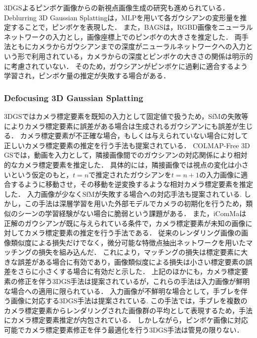 3DGSよるピンボケ画像からの新視点画像生成の研究も進められている．
Deblurring 3D Gaussian Splatting\cite{Deblurring3dgs}は，MLPを用いて各ガウシアンの変形量を推定することで，ピンボケを表現した．
また，BAGS\cite{BAGS}は，RGBD画像をニューラルネットワークの入力とし，画像座標上でのピンボケの大きさを推定した．
両手法ともにカメラからガウシアンまでの深度がニューラルネットワークへの入力という形で利用されている，カメラからの深度とピンボケの大きさの関係は明示的に考慮されていない．
そのため，ガウシアンがピンボケに過剰に適合するよう学習され，ピンボケ量の推定が失敗する場合がある．

\subsubsection{Defocusing 3D Gaussian Splatting}\label{subsec:defocusing_3dgs}
3DGSではカメラ標定要素を既知の入力として固定値で扱うため，SfMの失敗等によりカメラ標定要素に誤差がある場合は生成されるガウシアンにも誤差が生じる．
カメラ標定要素が不正確な場合，もしくは与えられていない場合に対して正しいカメラ標定要素の推定を行う手法も提案されている．
COLMAP-Free 3D GS\cite{colmapfree3dgaussiansplatting}では，動画を入力として，隣接画像間でのガウシアンの対応関係により相対的なカメラ標定要素を推定した．
具体的には，隣接画像では視点の変化は小さいという仮定のもと，$t=n$で推定されたガウシアンを$t=n+1$の入力画像に適合するように移動させ，その移動を逆変換するような相対カメラ標定要素を推定した．
入力画像が少なくSfMが失敗する場合への対応手法も提案されている\cite{instantsplat}.
しかし，この手法は深層学習を用いた外部モデル\cite{DUSt3R}でカメラの初期化を行うため，類似のシーンの学習経験がない場合に脆弱という課題がある．
また，iComMa\cite{iComMa}は正解のガウシアンが既に与えられている条件で，カメラ標定要素が未知の画像に対してカメラ標定要素の推定を行う手法である．
従来のレンダリング画像の画像類似度による損失だけでなく，微分可能な特徴点抽出ネットワーク\cite{LoFTR}を用いたマッチングの損失を組み込んだ．
これにより，マッチングの損失は標定要素に大きな誤差がある場合に有効であり，画像類似度による損失は小さい標定要素の誤差をさらに小さくする場合に有効だと示した．
上記のほかにも，カメラ標定要素の修正を伴う3DGS手法は提案されている\cite{ggrt}が，これらの手法は入力画像が鮮明な場合への適用に限られている．
入力画像が不鮮明な場合として，手ブレを伴う画像に対応する3DGS手法は提案されている\cite{BAD-Gaussians}.
この手法では，手ブレを複数のカメラ標定要素からレンダリングされた画像群の平均として表現するため，手法にカメラ標定要素推定が内包されている．
しかしながら，ピンボケ画像に対応可能でカメラ標定要素修正を伴う最適化を行う3DGS手法は管見の限りない．